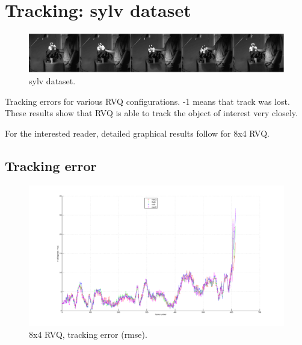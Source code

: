 \clearpage
\newpage
\section{Tracking: sylv dataset} 
								\begin{figure}[h!]
								\centering
								\includegraphics[width=1.0\textwidth]{thesis/seq_3_sylv.png}
								\caption{sylv dataset.}
								\label{fig:seq_3_sylv}
								\end{figure}



\begin{table}[h]
\centering

\caption{Tracking errors for various RVQ configurations.  -1 means that track was lost.  These results show that RVQ is able to track the object of interest very closely.}
\end{table}

For the interested reader, detailed graphical results follow for 8x4 RVQ.
\clearpage
\newpage
\subsection{Tracking error}

								\begin{figure}[h!]
								\centering
								\includegraphics[height=0.38\textheight]{thesis/3_sylv_8_4_1000_trk_rmse.pdf}
								\caption{8x4 RVQ, tracking error (rmse).}
								\label{fig:3_sylv_8_4_1000_trk_rmse}
								\end{figure}


